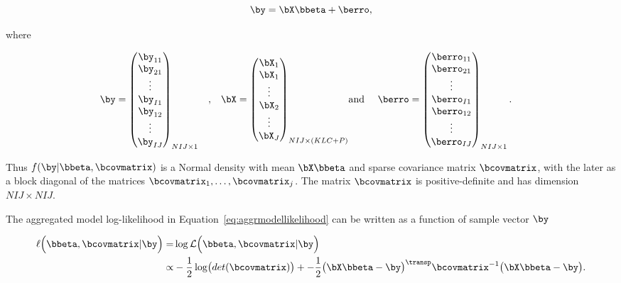 \begin{equation}
  \label{eq:byijmodel}
  \by = \bX \bbeta + \berro,
\end{equation}

\noindent where

\begin{align}
  &
    \by
    =
    \begin{pmatrix}
      \by_{11} \\
      \by_{21} \\
      \vdots \\
      \by_{I1} \\
      \by_{12} \\
      \vdots \\
      \by_{IJ}
    \end{pmatrix}_{NIJ \times 1}
  &
    ,
  &
  &
    \bX
    =
    \begin{pmatrix}
      \bX_1 \\
      \bX_1 \\
      \vdots\\
      \bX_2 \\
      \vdots\\
      \bX_J \\
    \end{pmatrix}_{NIJ \times (KLC+P)}
  &
    \text{and }
  &
  &
    \berro
    =
    \begin{pmatrix}
      \berro_{11} \\
      \berro_{21} \\
      \vdots \\
      \berro_{I1} \\
      \berro_{12} \\
      \vdots \\
      \berro_{IJ}
    \end{pmatrix}_{NIJ \times 1}.
  &
\end{align}

Thus $f(\by | \bbeta, \bcovmatrix)$ is a Normal density with mean $\bX \bbeta$ and sparse covariance matrix $\bcovmatrix$, with the later as a block diagonal of the matrices $\bcovmatrix_1, \dots, \bcovmatrix_j$. The matrix $\bcovmatrix$ is positive-definite and has dimension $NIJ \times NIJ$.

The aggregated model log-likelihood in Equation~\ref{eq:aggrmodellikelihood} can be written as a function of sample vector $\by$

\begin{align}
  \ell
  \Bigl(
  \bbeta, \bcovmatrix
  |
  \by
  \Bigr)
  =&
     \log \mathcal{L  \Bigl(
     \bbeta, \bcovmatrix
     |
     \by
     \Bigr)} \nonumber \\
  \propto
   &
     -\frac{1}{2} \log\bigl( det(\bcovmatrix) \bigr)
     +
     -\frac{1}{2}
     \bigl(
     \bX \bbeta - \by
     \bigr)^\transp
     \bcovmatrix^{-1}
     \bigl(
     \bX \bbeta - \by
     \bigr).
    \label{eq:vecaggrmodellk}
\end{align}

